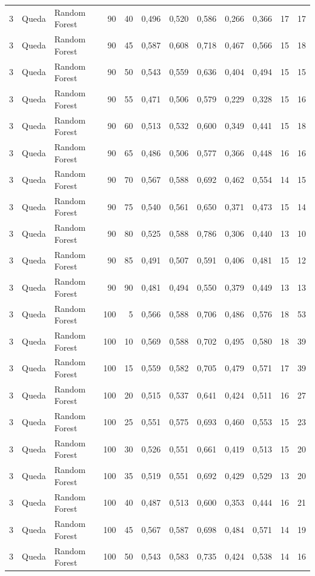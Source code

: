 \begin{longtable}{@{}rllrrrrrrrrr@{}}
3 & Queda & Random Forest & 90 & 40 & 0,496 & 0,520 & 0,586 & 0,266 & 0,366 & 17 & 17 \\
3 & Queda & Random Forest & 90 & 45 & 0,587 & 0,608 & 0,718 & 0,467 & 0,566 & 15 & 18 \\
3 & Queda & Random Forest & 90 & 50 & 0,543 & 0,559 & 0,636 & 0,404 & 0,494 & 15 & 15 \\
3 & Queda & Random Forest & 90 & 55 & 0,471 & 0,506 & 0,579 & 0,229 & 0,328 & 15 & 16 \\
3 & Queda & Random Forest & 90 & 60 & 0,513 & 0,532 & 0,600 & 0,349 & 0,441 & 15 & 18 \\
3 & Queda & Random Forest & 90 & 65 & 0,486 & 0,506 & 0,577 & 0,366 & 0,448 & 16 & 16 \\
3 & Queda & Random Forest & 90 & 70 & 0,567 & 0,588 & 0,692 & 0,462 & 0,554 & 14 & 15 \\
3 & Queda & Random Forest & 90 & 75 & 0,540 & 0,561 & 0,650 & 0,371 & 0,473 & 15 & 14 \\
3 & Queda & Random Forest & 90 & 80 & 0,525 & 0,588 & 0,786 & 0,306 & 0,440 & 13 & 10 \\
3 & Queda & Random Forest & 90 & 85 & 0,491 & 0,507 & 0,591 & 0,406 & 0,481 & 15 & 12 \\
3 & Queda & Random Forest & 90 & 90 & 0,481 & 0,494 & 0,550 & 0,379 & 0,449 & 13 & 13 \\
3 & Queda & Random Forest & 100 & 5 & 0,566 & 0,588 & 0,706 & 0,486 & 0,576 & 18 & 53 \\
3 & Queda & Random Forest & 100 & 10 & 0,569 & 0,588 & 0,702 & 0,495 & 0,580 & 18 & 39 \\
3 & Queda & Random Forest & 100 & 15 & 0,559 & 0,582 & 0,705 & 0,479 & 0,571 & 17 & 39 \\
3 & Queda & Random Forest & 100 & 20 & 0,515 & 0,537 & 0,641 & 0,424 & 0,511 & 16 & 27 \\
3 & Queda & Random Forest & 100 & 25 & 0,551 & 0,575 & 0,693 & 0,460 & 0,553 & 15 & 23 \\
3 & Queda & Random Forest & 100 & 30 & 0,526 & 0,551 & 0,661 & 0,419 & 0,513 & 15 & 20 \\
3 & Queda & Random Forest & 100 & 35 & 0,519 & 0,551 & 0,692 & 0,429 & 0,529 & 13 & 20 \\
3 & Queda & Random Forest & 100 & 40 & 0,487 & 0,513 & 0,600 & 0,353 & 0,444 & 16 & 21 \\
3 & Queda & Random Forest & 100 & 45 & 0,567 & 0,587 & 0,698 & 0,484 & 0,571 & 14 & 19 \\
3 & Queda & Random Forest & 100 & 50 & 0,543 & 0,583 & 0,735 & 0,424 & 0,538 & 14 & 16 \\

\end{longtable}
